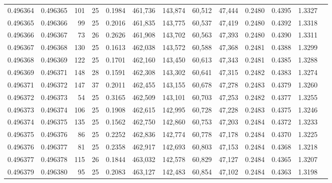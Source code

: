 \begin{tabular}{rrrrrrrrrrrrr}
0.496364 & 0.496365 & 101 &  25 &                                     0.1984 & 461,736 & 143,874 &  60,512 &  47,444 & 0.2480 & 0.4395 & 1.3327 \\
0.496365 & 0.496366 &  99 &  25 &                                     0.2016 & 461,835 & 143,775 &  60,537 &  47,419 & 0.2480 & 0.4392 & 1.3318 \\
0.496366 & 0.496367 &  73 &  26 &                                     0.2626 & 461,908 & 143,702 &  60,563 &  47,393 & 0.2480 & 0.4390 & 1.3311 \\
0.496367 & 0.496368 & 130 &  25 &                                     0.1613 & 462,038 & 143,572 &  60,588 &  47,368 & 0.2481 & 0.4388 & 1.3299 \\
0.496368 & 0.496369 & 122 &  25 &                                     0.1701 & 462,160 & 143,450 &  60,613 &  47,343 & 0.2481 & 0.4385 & 1.3288 \\
0.496369 & 0.496371 & 148 &  28 &                                     0.1591 & 462,308 & 143,302 &  60,641 &  47,315 & 0.2482 & 0.4383 & 1.3274 \\
0.496371 & 0.496372 & 147 &  37 &                                     0.2011 & 462,455 & 143,155 &  60,678 &  47,278 & 0.2483 & 0.4379 & 1.3260 \\
0.496372 & 0.496373 &  54 &  25 &                                     0.3165 & 462,509 & 143,101 &  60,703 &  47,253 & 0.2482 & 0.4377 & 1.3255 \\
0.496373 & 0.496374 & 106 &  25 &                                     0.1908 & 462,615 & 142,995 &  60,728 &  47,228 & 0.2483 & 0.4375 & 1.3246 \\
0.496374 & 0.496375 & 135 &  25 &                                     0.1562 & 462,750 & 142,860 &  60,753 &  47,203 & 0.2484 & 0.4372 & 1.3233 \\
0.496375 & 0.496376 &  86 &  25 &                                     0.2252 & 462,836 & 142,774 &  60,778 &  47,178 & 0.2484 & 0.4370 & 1.3225 \\
0.496376 & 0.496377 &  81 &  25 &                                     0.2358 & 462,917 & 142,693 &  60,803 &  47,153 & 0.2484 & 0.4368 & 1.3218 \\
0.496377 & 0.496378 & 115 &  26 &                                     0.1844 & 463,032 & 142,578 &  60,829 &  47,127 & 0.2484 & 0.4365 & 1.3207 \\
0.496379 & 0.496380 &  95 &  25 &                                     0.2083 & 463,127 & 142,483 &  60,854 &  47,102 & 0.2484 & 0.4363 & 1.3198 \\

\end{tabular}
